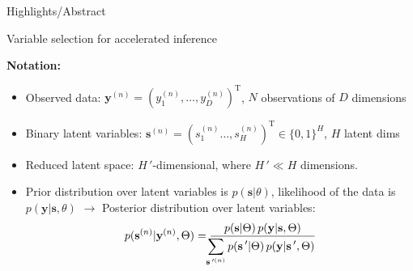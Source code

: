 \documentclass[final]{beamer}
\renewcommand{\vec}[1]{{\mathbf{#1}}}
\newcommand{\highlight}[1]{\textcolor{blocktbgn}{#1}}
\newcommand{\disS}{\displaystyle}
\newcommand{\Prime}{\,'}  %
\renewcommand{\vec}[1]{{\mathbf{#1}}}
\begin{document}
\begin{frame}{}
\begin{columns}[t]
\begin{column}{.33\linewidth}
\begin{block}{Highlights/Abstract}
    \vspace{-.3cm}
    \end{block}

    \begin{block}{Variable selection for accelerated inference}
          \vspace{-.5cm}

        \textbf{Notation:} \\
%
\begin{itemize}
\item \highlight{Observed data}: $\vec{y}^{(n)} = ( y_1^{(n)}, \dots, y_D^{(n)})^\mathrm{T}$, $N$ observations of $D$ dimensions


\item \highlight{Binary latent variables}: $\vec{s}^{(n)}=(s_1^{(n)}\dots, s^{(n)}_H)^\mathrm{T} \in \{0,1\}^{H}$, $H$ latent dims
\item \highlight{Reduced latent space}: $H\,'$-dimensional, where $H\,' \ll H$ dimensions.

\item \highlight{Prior distribution over latent variables} is $p(\vec{s} | \theta)$, \highlight{likelihood of the data} is $p(\vec{y} | \vec{s}, \theta)$ $\rightarrow$ \highlight{Posterior distribution over latent variables}: 
%
\vspace{-.05cm}
\normalsize
\begin{equation}
\label{eq:post}
p(\vec{s}^{(n)}|\vec{y}^{(n)},\Theta)  = \frac{p(\vec{s} | \Theta) \, p(\vec{y} | \vec{s}, \Theta)}
{\disS\hspace{-1.5mm}\sum_{\vec{s}\Prime^{(n)}} p(\vec{s}\Prime | \Theta) \, p(\vec{y} | \vec{s}\Prime, \Theta)}
\end{equation}
\large


\end{itemize}
\end{block}
\end{column}
\end{columns}
\end{frame}
\end{document}
